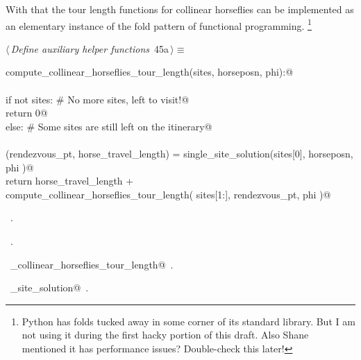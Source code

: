 \documentclass[11.5pt]{report}
\begin{document}
\vspace{-0.8cm}
With that the tour length functions for collinear horseflies can be implemented as 
an elementary instance of the fold pattern of functional programming. 
\footnote{Python has folds tucked away in some corner of its standard library. 
But I am not using it during the first hacky portion of this draft. Also Shane 
mentioned it has performance issues? Double-check this later!}


\begin{flushleft} \small\label{scrap64}\raggedright\small
{} $\langle\,${\itshape Define auxiliary helper functions}\nobreak\ {\footnotesize {45a}}$\,\rangle\equiv$
\vspace{-1ex}
\begin{list}{}{} \item
\mbox{}\verb@def compute_collinear_horseflies_tour_length(sites, horseposn, phi):@\\
\mbox{}\verb@@\\
\mbox{}\verb@     if not sites: # No more sites, left to visit!@\\
\mbox{}\verb@          return 0@\\
\mbox{}\verb@     else:         # Some sites are still left on the itinerary@\\
\mbox{}\verb@@\\
\mbox{}\verb@          (rendezvous_pt, horse_travel_length) = single_site_solution(sites[0], horseposn, phi )@\\
\mbox{}\verb@          return horse_travel_length  + \@\\
\mbox{}\verb@                 compute_collinear_horseflies_tour_length( sites[1:], rendezvous_pt, phi )@\\
\mbox{}\verb@@{\NWsep}
\end{list}
\vspace{-1.5ex}
\footnotesize
\begin{list}{}{\setlength{\itemsep}{-\parsep}\setlength{\itemindent}{-\leftmargin}}
\item \NWtxtMacroDefBy\ .
\item \NWtxtMacroRefIn\ .
\item \NWtxtIdentsDefed\nobreak\  \verb@compute_collinear_horseflies_tour_length@\nobreak\ .\item \NWtxtIdentsUsed\nobreak\  \verb@single_site_solution@\nobreak\ .
\item{}
\end{list}
\vspace{4ex}
\end{flushleft}
\end{document}
